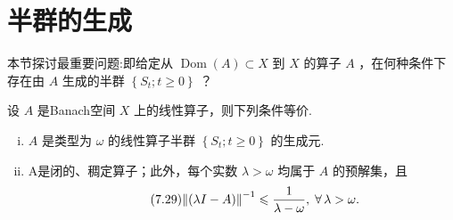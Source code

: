 \section{半群的生成}

本节探讨最重要问题:即给定从 $\operatorname{Dom}\left( A\right)  \subset  X$ 到 $X$ 的算子 $A$ ，在何种条件下存在由 $A$ 生成的半群 $\left\{  {{S}_{t};t \geq  0}\right\}$ ？

\begin{theorem}[线性算子生成半群的存在性]\label{thm:hille-yosida}
设 $A$ 是Banach空间 $X$ 上的线性算子，则下列条件等价.
\begin{enumerate}[(i)]
    \item $A$ 是类型为 $\omega$ 的线性算子半群 $\left\{  {{S}_{t};t \geq  0}\right\}$ 的生成元.
    \item A是闭的、稠定算子；此外，每个实数 $\lambda  > \omega$ 均属于 $A$ 的预解集，且
\begin{equation}\tag{7.29}\label{eq:hille-yosida-resolvent-bound}
\norm{\left( \lambda I - A\right) }^{-1} \leqslant  \frac{1}{\lambda  - \omega },\;\forall\,\lambda  > \omega .
\end{equation}
\end{enumerate}



\end{theorem}
